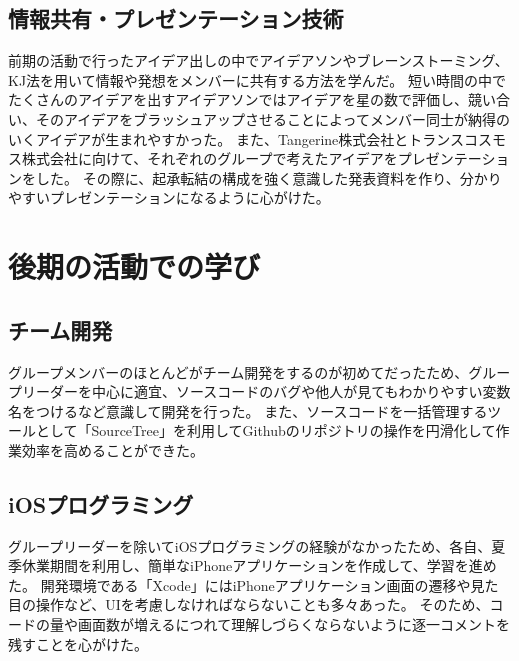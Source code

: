 \documentclass[openany,11pt,papersize]{jsbook}
\begin{document}

\subsection{情報共有・プレゼンテーション技術}
前期の活動で行ったアイデア出しの中でアイデアソンやブレーンストーミング、KJ法を用いて情報や発想をメンバーに共有する方法を学んだ。
短い時間の中でたくさんのアイデアを出すアイデアソンではアイデアを星の数で評価し、競い合い、そのアイデアをブラッシュアップさせることによってメンバー同士が納得のいくアイデアが生まれやすかった。
また、Tangerine株式会社とトランスコスモス株式会社に向けて、それぞれのグループで考えたアイデアをプレゼンテーションをした。
その際に、起承転結の構成を強く意識した発表資料を作り、分かりやすいプレゼンテーションになるように心がけた。


\section{後期の活動での学び}
\subsection{チーム開発}
グループメンバーのほとんどがチーム開発をするのが初めてだったため、グループリーダーを中心に適宜、ソースコードのバグや他人が見てもわかりやすい変数名をつけるなど意識して開発を行った。
また、ソースコードを一括管理するツールとして「SourceTree」を利用してGithubのリポジトリの操作を円滑化して作業効率を高めることができた。


\subsection{iOSプログラミング}
グループリーダーを除いてiOSプログラミングの経験がなかったため、各自、夏季休業期間を利用し、簡単なiPhoneアプリケーションを作成して、学習を進めた。
開発環境である「Xcode」にはiPhoneアプリケーション画面の遷移や見た目の操作など、UIを考慮しなければならないことも多々あった。
そのため、コードの量や画面数が増えるにつれて理解しづらくならないように逐一コメントを残すことを心がけた。

\end{document}
